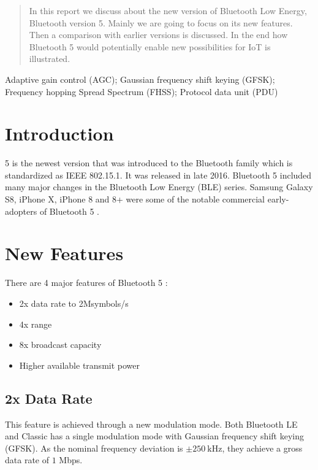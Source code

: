 \documentclass[journal, a4paper]{IEEEtran}
\begin{document}
\maketitle
    

\begin{abstract}
	In this report we discuss about the new version of Bluetooth Low Energy, Bluetooth version 5. Mainly we are going to focus on its new features. Then a comparison with earlier versions is discussed. In the end how Bluetooth 5 would potentially enable new possibilities for IoT is illustrated.
\end{abstract}

\begin{IEEEkeywords}
Adaptive gain control (AGC); Gaussian frequency shift keying (GFSK); Frequency hopping Spread Spectrum (FHSS); Protocol data unit (PDU)
\end{IEEEkeywords}


\section{Introduction}

	 5 is the newest version that was introduced to the Bluetooth family which is standardized as IEEE 802.15.1. It was released in late 2016. Bluetooth 5 included many major changes in the Bluetooth Low Energy (BLE) series. Samsung Galaxy S8, iPhone X, iPhone 8 and 8+ were some of the notable commercial early-adopters of Bluetooth 5 \cite{WIKI}. 
	
\section{New Features}

There are 4 major features of Bluetooth 5 \cite{SCHULZ}:

\begin{itemize}
\item 2x data rate to 2Msymbols/s 
\item 4x range
\item 8x broadcast capacity
\item Higher available transmit power
\end{itemize}

\subsection{2x Data Rate}

This feature is achieved through a new modulation mode. Both Bluetooth LE and Classic has a single modulation mode with Gaussian frequency shift keying (GFSK). As the nominal frequency deviation is $\pm 250~\text{kHz}$, they achieve a gross data rate of $1$ Mbps.
\end{document}
